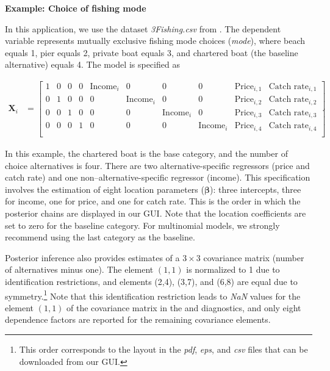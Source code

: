 \textbf{Example: Choice of fishing mode}

In this application, we use the dataset \textit{3Fishing.csv} from \cite[p.~491]{cameron05}. The dependent variable represents mutually exclusive fishing mode choices (\textit{mode}), where beach equals 1, pier equals 2, private boat equals 3, and chartered boat (the baseline alternative) equals 4. The model is specified as

{\footnotesize{
		\begin{align*}
			\bm{X}_i & = \begin{bmatrix}
				1 & 0 & 0 & 0 & \text{Income}_i & 0 & 0 & 0 & \text{Price}_{i,1} & \text{Catch rate}_{i,1}\\ 
				0 & 1 & 0 & 0 & 0 & \text{Income}_i & 0 & 0 & \text{Price}_{i,2} & \text{Catch rate}_{i,2}\\
				0 & 0 & 1 & 0 & 0 & 0 & \text{Income}_i & 0 & \text{Price}_{i,3} & \text{Catch rate}_{i,3}\\
				0 & 0 & 0 & 1 & 0 & 0 & 0 & \text{Income}_i & \text{Price}_{i,4} & \text{Catch rate}_{i,4}\\
			\end{bmatrix}.
		\end{align*}
}}

In this example, the chartered boat is the base category, and the number of choice alternatives is four. There are two alternative-specific regressors (price and catch rate) and one non–alternative-specific regressor (income). This specification involves the estimation of eight location parameters ($\bm{\beta}$): three intercepts, three for income, one for price, and one for catch rate. This is the order in which the posterior chains are displayed in our GUI. Note that the location coefficients are set to zero for the baseline category. For multinomial models, we strongly recommend using the last category as the baseline.

Posterior inference also provides estimates of a $3 \times 3$ covariance matrix (number of alternatives minus one). The element $(1,1)$ is normalized to 1 due to identification restrictions, and elements (2,4), (3,7), and (6,8) are equal due to symmetry.\footnote{This order corresponds to the layout in the \textit{pdf}, \textit{eps}, and \textit{csv} files that can be downloaded from our GUI.} Note that this identification restriction leads to \textit{NaN} values for the element $(1,1)$ of the covariance matrix in the \cite{Geweke1992} and \cite{Heidelberger1983} diagnostics, and only eight dependence factors are reported for the remaining covariance elements.

